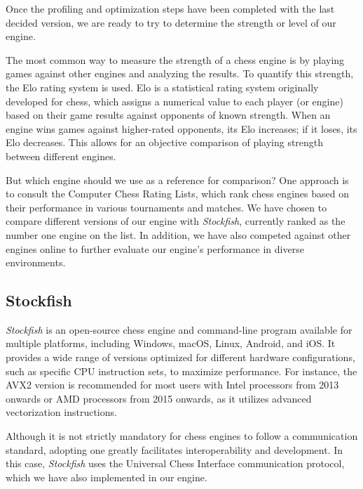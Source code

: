 Once the profiling and optimization steps have been completed with the last decided version, we are ready to try to determine the strength or level of our engine.

\vspace{1em}

\noindent The most common way to measure the strength of a chess engine is by playing games against other engines and analyzing the results. To quantify this strength, the Elo rating system is used. Elo is a statistical rating system originally developed for chess, which assigns a numerical value to each player (or engine) based on their game results against opponents of known strength. When an engine wins games against higher-rated opponents, its Elo increases; if it loses, its Elo decreases. This allows for an objective comparison of playing strength between different engines.

\vspace{1em}

\noindent But which engine should we use as a reference for comparison? One approach is to consult the Computer Chess Rating Lists, which rank chess engines based on their performance in various tournaments and matches. We have chosen to compare different versions of our engine with \textit{Stockfish}, currently ranked as the number one engine on the list. In addition, we have also competed against other engines online to further evaluate our engine's performance in diverse environments.

\subsection{Stockfish}

\textit{Stockfish} is an open-source chess engine and command-line program available for multiple platforms, including Windows, macOS, Linux, Android, and iOS. It provides a wide range of versions optimized for different hardware configurations, such as specific CPU instruction sets, to maximize performance. For instance, the AVX2 version is recommended for most users with Intel processors from 2013 onwards or AMD processors from 2015 onwards, as it utilizes advanced vectorization instructions.

\vspace{1em}

\noindent Although it is not strictly mandatory for chess engines to follow a communication standard, adopting one greatly facilitates interoperability and development. In this case, \textit{Stockfish} uses the Universal Chess Interface communication protocol, which we have also implemented in our engine.

